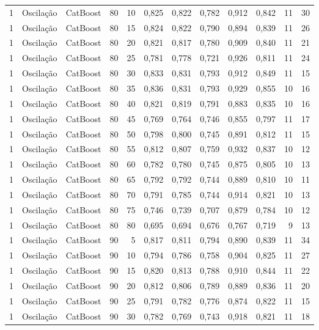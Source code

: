 \begin{longtable}{@{}rllrrrrrrrrr@{}}
1 & Oscilação & CatBoost & 80 & 10 & 0,825 & 0,822 & 0,782 & 0,912 & 0,842 & 11 & 30 \\
1 & Oscilação & CatBoost & 80 & 15 & 0,824 & 0,822 & 0,790 & 0,894 & 0,839 & 11 & 26 \\
1 & Oscilação & CatBoost & 80 & 20 & 0,821 & 0,817 & 0,780 & 0,909 & 0,840 & 11 & 21 \\
1 & Oscilação & CatBoost & 80 & 25 & 0,781 & 0,778 & 0,721 & 0,926 & 0,811 & 11 & 24 \\
1 & Oscilação & CatBoost & 80 & 30 & 0,833 & 0,831 & 0,793 & 0,912 & 0,849 & 11 & 15 \\
1 & Oscilação & CatBoost & 80 & 35 & 0,836 & 0,831 & 0,793 & 0,929 & 0,855 & 10 & 16 \\
1 & Oscilação & CatBoost & 80 & 40 & 0,821 & 0,819 & 0,791 & 0,883 & 0,835 & 10 & 16 \\
1 & Oscilação & CatBoost & 80 & 45 & 0,769 & 0,764 & 0,746 & 0,855 & 0,797 & 11 & 17 \\
1 & Oscilação & CatBoost & 80 & 50 & 0,798 & 0,800 & 0,745 & 0,891 & 0,812 & 11 & 15 \\
1 & Oscilação & CatBoost & 80 & 55 & 0,812 & 0,807 & 0,759 & 0,932 & 0,837 & 10 & 12 \\
1 & Oscilação & CatBoost & 80 & 60 & 0,782 & 0,780 & 0,745 & 0,875 & 0,805 & 10 & 13 \\
1 & Oscilação & CatBoost & 80 & 65 & 0,792 & 0,792 & 0,744 & 0,889 & 0,810 & 10 & 11 \\
1 & Oscilação & CatBoost & 80 & 70 & 0,791 & 0,785 & 0,744 & 0,914 & 0,821 & 10 & 13 \\
1 & Oscilação & CatBoost & 80 & 75 & 0,746 & 0,739 & 0,707 & 0,879 & 0,784 & 10 & 12 \\
1 & Oscilação & CatBoost & 80 & 80 & 0,695 & 0,694 & 0,676 & 0,767 & 0,719 & 9 & 13 \\
1 & Oscilação & CatBoost & 90 & 5 & 0,817 & 0,811 & 0,794 & 0,890 & 0,839 & 11 & 34 \\
1 & Oscilação & CatBoost & 90 & 10 & 0,794 & 0,786 & 0,758 & 0,904 & 0,825 & 11 & 27 \\
1 & Oscilação & CatBoost & 90 & 15 & 0,820 & 0,813 & 0,788 & 0,910 & 0,844 & 11 & 22 \\
1 & Oscilação & CatBoost & 90 & 20 & 0,812 & 0,806 & 0,789 & 0,889 & 0,836 & 11 & 20 \\
1 & Oscilação & CatBoost & 90 & 25 & 0,791 & 0,782 & 0,776 & 0,874 & 0,822 & 11 & 15 \\
1 & Oscilação & CatBoost & 90 & 30 & 0,782 & 0,769 & 0,743 & 0,918 & 0,821 & 11 & 18 \\

\end{longtable}

